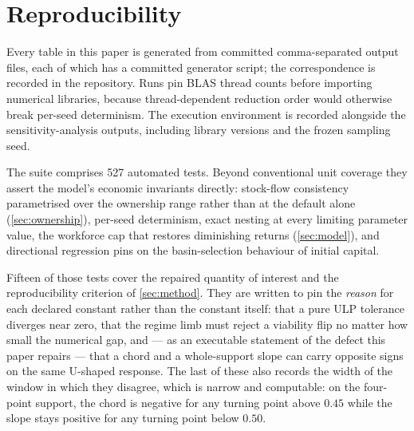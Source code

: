 
\section{Reproducibility}
\label{app:repro}

Every table in this paper is generated from committed comma-separated output
files, each of which has a committed generator script; the correspondence is
recorded in the repository. Runs pin BLAS thread counts before importing
numerical libraries, because thread-dependent reduction order would otherwise
break per-seed determinism. The execution environment is recorded alongside
the sensitivity-analysis outputs, including library versions and the frozen
sampling seed.

The suite comprises 527 automated tests. Beyond conventional unit coverage
they assert the model's economic invariants directly: stock-flow consistency
parametrised over the ownership range rather than at the default alone
(\cref{sec:ownership}), per-seed determinism, exact nesting at every limiting
parameter value, the workforce cap that restores diminishing returns
(\cref{sec:model}), and directional regression pins on the basin-selection
behaviour of initial capital.

Fifteen of those tests cover the repaired quantity of interest and the
reproducibility criterion of \cref{sec:method}. They are written to pin the
\emph{reason} for each declared constant rather than the constant itself: that
a pure ULP tolerance diverges near zero, that the regime limb must reject a
viability flip no matter how small the numerical gap, and --- as an executable
statement of the defect this paper repairs --- that a chord and a
whole-support slope can carry opposite signs on the same U-shaped response.
The last of these also records the width of the window in which they disagree,
which is narrow and computable: on the four-point support, the chord is
negative for any turning point above $0.45$ while the slope stays positive for
any turning point below $0.50$.
